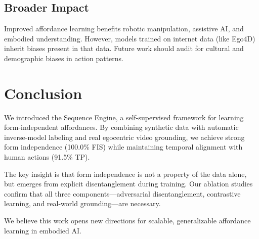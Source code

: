 \documentclass[11pt]{article}
\begin{document}
\subsection{Broader Impact}

Improved affordance learning benefits robotic manipulation, assistive AI, and embodied understanding. However, models trained on internet data (like Ego4D) inherit biases present in that data. Future work should audit for cultural and demographic biases in action patterns.

\section{Conclusion}

We introduced the Sequence Engine, a self-supervised framework for learning form-independent affordances. By combining synthetic data with automatic inverse-model labeling and real egocentric video grounding, we achieve strong form independence (100.0\% FIS) while maintaining temporal alignment with human actions (91.5\% TP).

The key insight is that form independence is not a property of the data alone, but emerges from explicit disentanglement during training. Our ablation studies confirm that all three components—adversarial disentanglement, contrastive learning, and real-world grounding—are necessary.

We believe this work opens new directions for scalable, generalizable affordance learning in embodied AI.
\end{document}
